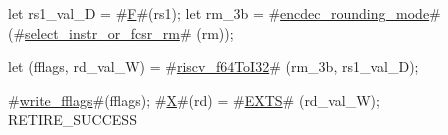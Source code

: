let rs1_val_D = #\hyperref[sailRISCVzF]{F}#(rs1);
let rm_3b     = #\hyperref[sailRISCVzencdeczyroundingzymode]{encdec\_rounding\_mode}# (#\hyperref[sailRISCVzselectzyinstrzyorzyfcsrzyrm]{select\_instr\_or\_fcsr\_rm}#  (rm));

let (fflags, rd_val_W) = #\hyperref[sailRISCVzriscvzyf64ToI32]{riscv\_f64ToI32}# (rm_3b, rs1_val_D);

#\hyperref[sailRISCVzwritezyfflags]{write\_fflags}#(fflags);
#\hyperref[sailRISCVzX]{X}#(rd) = #\hyperref[sailRISCVzEXTS]{EXTS}# (rd_val_W);
RETIRE_SUCCESS
